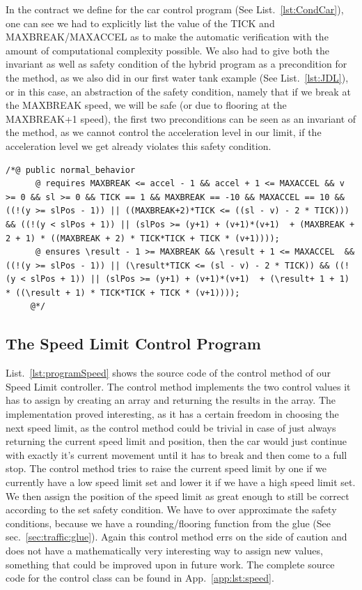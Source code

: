 In the contract we define for the car control program (See List.~\ref{lst:CondCar}),  one can see we had to explicitly list the value of the TICK and MAXBREAK/MAXACCEL as to make the automatic verification with the amount of computational complexity possible. We also had to give both the invariant as well as safety condition of the hybrid program as a precondition for the method, as we also did in our first water tank example (See List.~\ref{lst:JDL}), or in this case, an abstraction of the safety condition, namely that if we break at the MAXBREAK speed, we will be safe (or due to flooring at the MAXBREAK+1 speed), the first two preconditions can be seen as an invariant of the method, as we cannot control the acceleration level in our limit, if the acceleration level we get already violates this safety condition.
\begin{lstlisting}[label=lst:CondCar]
/*@ public normal_behavior
	  @ requires MAXBREAK <= accel - 1 && accel + 1 <= MAXACCEL && v >= 0 && sl >= 0 && TICK == 1 && MAXBREAK == -10 && MAXACCEL == 10 && ((!(y >= slPos - 1)) || ((MAXBREAK+2)*TICK <= ((sl - v) - 2 * TICK))) && ((!(y < slPos + 1)) || (slPos >= (y+1) + (v+1)*(v+1)  + (MAXBREAK + 2 + 1) * ((MAXBREAK + 2) * TICK*TICK + TICK * (v+1))));
	  @ ensures \result - 1 >= MAXBREAK && \result + 1 <= MAXACCEL  && ((!(y >= slPos - 1)) || (\result*TICK <= (sl - v) - 2 * TICK)) && ((!(y < slPos + 1)) || (slPos >= (y+1) + (v+1)*(v+1)  + (\result+ 1 + 1) * ((\result + 1) * TICK*TICK + TICK * (v+1))));
	 @*/
\end{lstlisting}

\subsection{The Speed Limit Control Program}
\label{subsec:traffic:speed}

List.~\ref{lst:programSpeed} shows the source code of the control method of our Speed Limit controller. The control method implements the two control values it has to assign by creating an array and returning the results in the array. The implementation proved interesting, as it has a certain freedom in choosing the next speed limit, as the control method could be trivial in case of just always returning the current speed limit and position, then the car would just continue with exactly it's current movement until it has to break and then come to a full stop. The control method tries to raise the current speed limit by one if we currently have a low speed limit set and lower it if we have a high speed limit set. We then assign the position of the speed limit as great enough to still be correct according to the set safety condition. We have to over approximate the safety conditions, because we have a rounding/flooring function from the glue (See sec.~\ref{sec:traffic:glue}). Again this control method errs on the side of caution and does not have a mathematically very interesting way to assign new values, something that could be improved upon in future work. The complete source code for the control class can be found in App.~\ref{app:lst:speed}.

